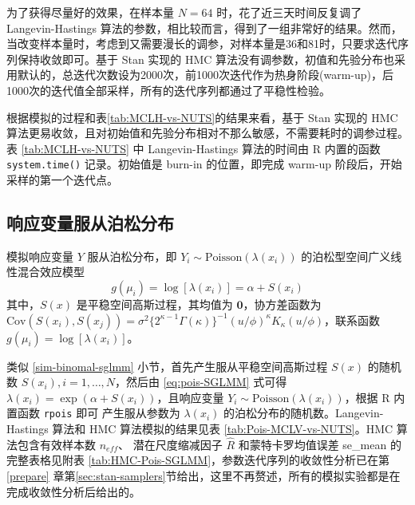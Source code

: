 \documentclass[12pt,a4paper,UTF8,twoside]{book}
\theoremstyle{definition}
\theoremstyle{definition}
\theoremstyle{definition}
\theoremstyle{remark}
\begin{document}
为了获得尽量好的效果，在样本量 \(N = 64\) 时，花了近三天时间反复调了
Langevin-Hastings
算法的参数，相比较而言，得到了一组非常好的结果。然而，当改变样本量时，考虑到又需要漫长的调参，对样本量是36和81时，只要求迭代序列保持收敛即可。基于
Stan 实现的 HMC
算法没有调参数，初值和先验分布也采用默认的，总迭代次数设为2000次，前1000次迭代作为热身阶段(warm-up)，后1000次的迭代值全部采样，所有的迭代序列都通过了平稳性检验。

根据模拟的过程和表\ref{tab:MCLH-vs-NUTS}的结果来看，基于 Stan 实现的 HMC
算法更易收敛，且对初始值和先验分布相对不那么敏感，不需要耗时的调参过程。表
\ref{tab:MCLH-vs-NUTS} 中 Langevin-Hastings 算法的时间由 R 内置的函数
\texttt{system.time()} 记录。初始值是 burn-in 的位置，即完成 warm-up
阶段后，开始采样的第一个迭代点。

\hypertarget{possion-sglmm}{%
\subsection{响应变量服从泊松分布}\label{possion-sglmm}}

模拟响应变量 \(Y\) 服从泊松分布，即
\(Y_i \sim \mathrm{Poisson}(\lambda(x_{i}))\)
的泊松型空间广义线性混合效应模型 \begin{equation}
g(\mu_i) = \log[\lambda(x_i)] = \alpha + S(x_i) \label{eq:pois-SGLMM}
\end{equation} \noindent 其中，\(S(x)\) 是平稳空间高斯过程，其均值为
\(\mathbf{0}\)，协方差函数为
\(\mathrm{Cov}(S(x_i),S(x_j)) = \sigma^2 \big\{2^{\kappa-1}\Gamma(\kappa)\big\}^{-1}(u/\phi)^{\kappa}K_{\kappa}(u/\phi)\)，联系函数
\(g(\mu_i) = \log[\lambda(x_{i})]\)。

类似 \ref{sim-binomal-sglmm} 小节，首先产生服从平稳空间高斯过程 \(S(x)\)
的随机数 \(S(x_i),i=1,\ldots,N\)，然后由 \eqref{eq:pois-SGLMM} 式可得
\(\lambda(x_i) = \exp(\alpha + S(x_i))\)，且响应变量
\(Y_i \sim \mathrm{Poisson}(\lambda(x_{i}))\)，根据 R 内置函数
\texttt{rpois} 即可 产生服从参数为 \(\lambda(x_i)\)
的泊松分布的随机数。Langevin-Hastings 算法和 HMC 算法模拟的结果见表
\ref{tab:Pois-MCLV-vs-NUTS}。HMC 算法包含有效样本数 \(n_{eff}\)、
潜在尺度缩减因子 \(\hat{R}\) 和蒙特卡罗均值误差 se\_mean
的完整表格见附表
\ref{tab:HMC-Pois-SGLMM}，参数迭代序列的收敛性分析已在第\ref{prepare}
章第\ref{sec:stan-samplers}节给出，这里不再赘述，所有的模拟实验都是在完成收敛性分析后给出的。
\end{document}
